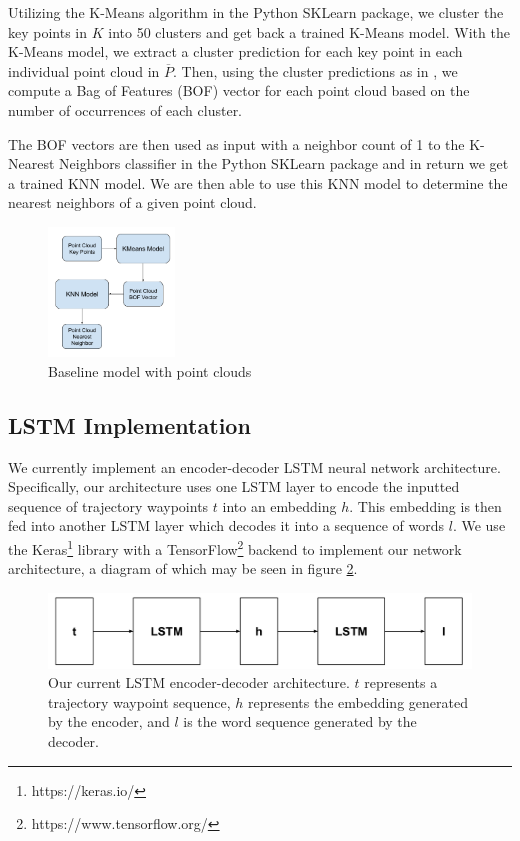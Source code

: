 \documentclass[letterpaper, 12 pt, conference]{ieeeconf}
\begin{document}
Utilizing the K-Means algorithm in the Python SKLearn package, we cluster the key points in $K$ into 50 clusters and get back a trained K-Means model. With the K-Means model, we extract a cluster prediction for each key point in each individual point cloud in $\overline{P}$. Then, using the cluster predictions as in \cite{csurka2004visual}, we compute a Bag of Features (BOF) vector for each point cloud based on the number of occurrences of each cluster.

The BOF vectors are then used as input with a neighbor count of 1 to the K-Nearest Neighbors classifier in the Python SKLearn package and in return we get a trained KNN model. We are then able to use this KNN model to determine the nearest neighbors of a given point cloud. 


\begin{figure}[htb!]
  \centering
  \includegraphics[width=0.3\textwidth]{Baseline-[Point_Cloud]}
  \caption{Baseline model with point clouds}
  \label{fig:Baseline_Point_Cloud}
\end{figure}

\subsection{LSTM Implementation}

We currently implement an encoder-decoder LSTM neural network architecture. Specifically, our architecture uses one LSTM layer to encode the inputted sequence of trajectory waypoints $t$ into an embedding $h$. This embedding is then fed into another LSTM layer which decodes it into a sequence of words $l$. We use the Keras\footnote{https://keras.io/} library with a TensorFlow\footnote{https://www.tensorflow.org/} backend to implement our network architecture, a diagram of which may be seen in figure \ref{fig:LSTM_diagram_1}.   

\begin{figure}[h]
\center
\includegraphics[scale=0.20]{Trajectory_LSTM}
\caption{Our current LSTM encoder-decoder architecture. $t$ represents a trajectory waypoint sequence, $h$ represents the embedding generated by the encoder, and $l$ is the word sequence generated by the decoder.}
\label{fig:LSTM_diagram_1}
\end{figure}
\end{document}
